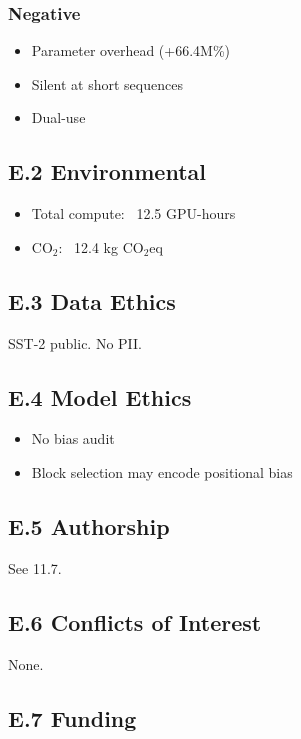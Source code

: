 \subsubsection{Negative}
\begin{itemize}
\item Parameter overhead (+66.4M\%)
\item Silent at short sequences
\item Dual-use

\end{itemize}
\subsection{E.2 Environmental}

\begin{itemize}
\item Total compute: ~12.5 GPU-hours
\item CO$_2$: ~12.4 kg CO$_2$eq

\end{itemize}
\subsection{E.3 Data Ethics}

SST-2 public. No PII.

\subsection{E.4 Model Ethics}

\begin{itemize}
\item No bias audit
\item Block selection may encode positional bias

\end{itemize}
\subsection{E.5 Authorship}

See  11.7.

\subsection{E.6 Conflicts of Interest}

None.

\subsection{E.7 Funding}

